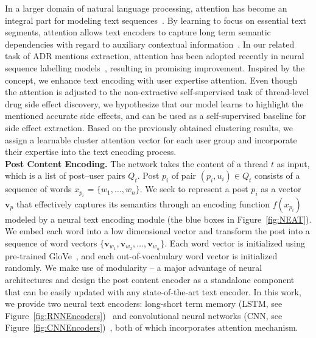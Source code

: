 \documentclass{bmcart}
\begin{document}
In a larger domain of natural language processing, attention has become an integral part for modeling text sequences~\cite{luong2015effective,vaswani2017attention}. By learning to focus on essential text segments, attention allows text encoders to capture long term semantic dependencies with regard to auxiliary contextual information~\cite{chen2016neural,feng2019attention}. 
In our related task of ADR mentions extraction, attention has been adopted recently in neural sequence labelling models~\cite{ding2018attentive,ramamoorthy2018attentive}, 
resulting in promising improvement. 
Inspired by the concept, we enhance text encoding with user expertise attention. Even though the attention is adjusted to the non-extractive self-supervised task of thread-level drug side effect discovery, we hypothesize that our model learns to highlight the mentioned accurate side effects, and can be used as a self-supervised baseline for side effect extraction. Based on the previously obtained clustering results, we assign a learnable cluster attention vector for each user group and incorporate their expertise into the text encoding process. \\

\textbf{Post Content Encoding.} The network takes the content of a
thread $t$ as input, which is a list of post--user pairs $Q_t$.  Post
$p_i$ of pair $\left(p_i, u_i\right)\in Q_t$ consists of a sequence of words $x_{p_i}$ = $\{w_1, \ldots, w_n\}$.
We seek to represent a post $p_{i}$ as a vector $\boldsymbol{v}_{p}$ 
that effectively captures its semantics through an encoding function $f(x_{p_i})$ modeled by a neural text encoding module (the blue boxes in Figure~\ref{fig:NEAT}). 
We embed each word into a low dimensional vector 
and transform the post into a sequence of word vectors
$\{\boldsymbol{v}_{w_1}, \boldsymbol{v}_{w_2},\ldots,
\boldsymbol{v}_{w_n}\}$. Each word vector is initialized using pre-trained GloVe~\cite{pennington2014glove}, and each out-of-vocabulary word vector is initialized randomly. We make use of modularity -- a major advantage of neural architectures and design the post content encoder as a standalone component that can be easily updated with any state-of-the-art text encoder. In this work, we provide two neural text encoders: 
long-short term memory (LSTM, see Figure~\ref{fig:RNNEncoders})~\cite{hochreiter1997long} 
and convolutional neural networks 
(CNN, see Figure~\ref{fig:CNNEncoders})~\cite{kim2014convolutional}, 
both of which incorporates attention mechanism.
\end{document}
